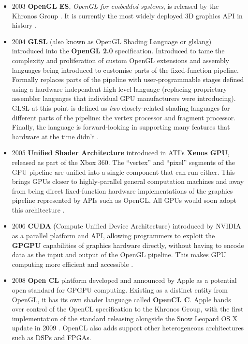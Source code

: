 \documentclass[a4paper,12pt,twoside,openright]{report}
\begin{document}
\begin{itemize}
    \item 2003 \textbf{OpenGL ES}, \textit{OpenGL for embedded systems}, is
    released by the Khronos Group \cite{OpenGLESRelease}. It is currently the
    most widely deployed 3D graphics API in history \cite{OpenGLES}.

    \item 2004 \textbf{GLSL} (also known as OpenGL Shading Language or glslang)
    introduced into the \textbf{OpenGL 2.0} specification. Introduced to tame
    the complexity and proliferation of custom OpenGL extensions and assembly
    languages being introduced to customise parts of the fixed-function
    pipeline. Formally replaces parts of the pipeline with user-programmable
    stages defined using a hardware-independent high-level language (replacing
    proprietary assembler languages that individual GPU manufacturers were
    introducing). GLSL at this point is defined as \textit{two} closely-related
    shading languages for different parts of the pipeline: the vertex processor
    and fragment processor. Finally, the language is forward-looking in
    supporting many features that hardware at the time didn't \cite{GLSL_1_10}.

    \item 2005 \textbf{Unified Shader Architecture} introduced in ATI's
    \textbf{Xenos GPU}, released as part of the Xbox 360. The ``vertex'' and
    ``pixel'' segments of the GPU pipeline are unified into a single component
    that can run either. This brings GPUs closer to highly-parallel general
    computation machines and away from being direct fixed-function hardware
    implementations of the graphics pipeline represented by APIs such as
    OpenGL. \cite{XenosDemystified} All GPUs would soon adopt this architecture
    \cite{HistoryOfTheGPU}.

    \item 2006 \textbf{CUDA} (Compute Unified Device Architecture) introduced
    by NVIDIA as a parallel platform and API, allowing programmers to exploit
    the \textbf{GPGPU} capabilities of graphics hardware directly, without
    having to encode data as the input and output of the OpenGL pipeline. This
    makes GPU computing more efficient and accessible \cite{AboutCUDA}.

    \item 2008 \textbf{Open CL} platform developed and announced by Apple as a
    potential open standard for GPGPU computing. Existing as a distinct entity
    from OpenGL, it has its own shader language called \textbf{OpenCL C}. Apple
    hands over control of the OpenCL specification to the Khronos Group, with
    the first implementation of the standard releasing alongside the Snow
    Leopard OS X update in 2009 \cite{OpenCL}. OpenCL also adds support other
    heterogeneous architectures such as DSPs and FPGAs.


\end{itemize}
\end{document}
